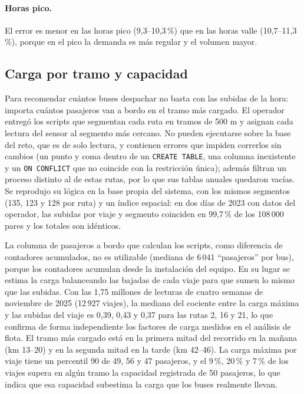 \documentclass[11pt,a4paper]{article}
\begin{document}
\paragraph{Horas pico.} El error es menor en las horas pico (9,3--10,3\,\%) que en las horas valle (10,7--11,3\,\%), porque en el pico la demanda es más regular y el volumen mayor.

\subsection{Carga por tramo y capacidad}
\label{sec:segmentos}

Para recomendar cuántos buses despachar no basta con las subidas de la hora: importa cuántos pasajeros van a bordo en el tramo más cargado. El operador entregó los scripts que segmentan cada ruta en tramos de 500 m y asignan cada lectura del sensor al segmento más cercano. No pueden ejecutarse sobre la base del reto, que es de solo lectura, y contienen errores que impiden correrlos sin cambios (un punto y coma dentro de un \texttt{CREATE TABLE}, una columna inexistente y un \texttt{ON CONFLICT} que no coincide con la restricción única); además filtran un proceso distinto al de estas rutas, por lo que sus tablas anuales quedaron vacías. Se reprodujo su lógica en la base propia del sistema, con los mismos segmentos (135, 123 y 128 por ruta) y un índice espacial: en dos días de 2023 con datos del operador, las subidas por viaje y segmento coinciden en 99,7\,\% de los 108\,000 pares y los totales son idénticos.

La columna de pasajeros a bordo que calculan los scripts, como diferencia de contadores acumulados, no es utilizable (mediana de 6\,041 ``pasajeros'' por bus), porque los contadores acumulan desde la instalación del equipo. En su lugar se estima la carga balanceando las bajadas de cada viaje para que sumen lo mismo que las subidas. Con las 1,75 millones de lecturas de cuatro semanas de noviembre de 2025 (12\,927 viajes), la mediana del cociente entre la carga máxima y las subidas del viaje es 0,39, 0,43 y 0,37 para las rutas 2, 16 y 21, lo que confirma de forma independiente los factores de carga medidos en el análisis de flota. El tramo más cargado está en la primera mitad del recorrido en la mañana (km 13--20) y en la segunda mitad en la tarde (km 42--46). La carga máxima por viaje tiene un percentil 90 de 49, 56 y 47 pasajeros, y el 9\,\%, 20\,\% y 7\,\% de los viajes supera en algún tramo la capacidad registrada de 50 pasajeros, lo que indica que esa capacidad subestima la carga que los buses realmente llevan.
\end{document}
